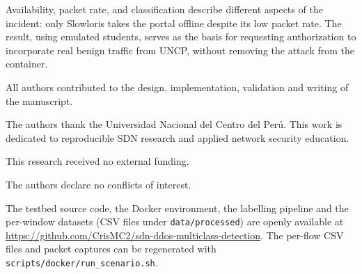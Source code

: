 \documentclass[ASNA,twocolumn]{USG}
\begin{document}
  Availability, packet rate, and classification describe different aspects of the incident: only Slowloris takes the portal offline despite its low packet rate. The result, using emulated students, serves as the basis for requesting authorization to incorporate real benign traffic from UNCP, without removing the attack from the container.

All authors contributed to the design, implementation, validation and writing of the manuscript.

The authors thank the Universidad Nacional del Centro del Per\'u. This work is dedicated to reproducible SDN research and applied network security education.

This research received no external funding.

The authors declare no conflicts of interest.

The testbed source code, the Docker environment, the labelling pipeline and the per-window datasets (CSV files under \texttt{data/processed}) are openly available at \url{https://github.com/CrisMC2/sdn-ddos-multiclass-detection}. The per-flow CSV files and packet captures can be regenerated with \texttt{scripts/docker/run\_scenario.sh}.


\end{document}
